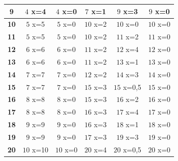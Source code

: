 \documentclass{article}
\begin{document}
\begin{center}
\begin{tabular}{|c||c|c|c|c|c|}
        \hline
        \textbf{9}& \cellcolor[HTML]{3FFC45}$4$ x={4} & \cellcolor[HTML]{FC3F3F}$4$ x={0}& \cellcolor[HTML]{3FFC45}$7$ x={1} & \cellcolor[HTML]{3FFC45}$9$ x={3} & \cellcolor[HTML]{FC3F3F}$9$ x={0}\\
        \hline
        \textbf{10}& \cellcolor[HTML]{3FFC45}$5$ x={5} & \cellcolor[HTML]{FC3F3F}$5$ x={0}& \cellcolor[HTML]{3FFC45}$10$ x={2} & \cellcolor[HTML]{FC3F3F}$10$ x={0}& \cellcolor[HTML]{FC3F3F}$10$ x={0}\\
        \hline
        \textbf{11}& \cellcolor[HTML]{3FFC45}$5$ x={5} & \cellcolor[HTML]{FC3F3F}$5$ x={0}& \cellcolor[HTML]{3FFC45}$10$ x={2} & \cellcolor[HTML]{3FFC45}$11$ x={2} & \cellcolor[HTML]{FC3F3F}$11$ x={0}\\
        \hline
        \textbf{12}& \cellcolor[HTML]{3FFC45}$6$ x={6} & \cellcolor[HTML]{FC3F3F}$6$ x={0}& \cellcolor[HTML]{3FFC45}$11$ x={2} & \cellcolor[HTML]{3FFC45}$12$ x={4} & \cellcolor[HTML]{FC3F3F}$12$ x={0}\\
        \hline
        \textbf{13}& \cellcolor[HTML]{3FFC45}$6$ x={6} & \cellcolor[HTML]{FC3F3F}$6$ x={0}& \cellcolor[HTML]{3FFC45}$11$ x={2} & \cellcolor[HTML]{3FFC45}$13$ x={1} & \cellcolor[HTML]{FC3F3F}$13$ x={0}\\
        \hline
        \textbf{14}& \cellcolor[HTML]{3FFC45}$7$ x={7} & \cellcolor[HTML]{FC3F3F}$7$ x={0}& \cellcolor[HTML]{3FFC45}$12$ x={2} & \cellcolor[HTML]{3FFC45}$14$ x={3} & \cellcolor[HTML]{FC3F3F}$14$ x={0}\\
        \hline
        \textbf{15}& \cellcolor[HTML]{3FFC45}$7$ x={7} & \cellcolor[HTML]{FC3F3F}$7$ x={0}& \cellcolor[HTML]{3FFC45}$15$ x={3} & \cellcolor[HTML]{3F62FC}$15$ x={0,5}& \cellcolor[HTML]{FC3F3F}$15$ x={0}\\
        \hline
        \textbf{16}& \cellcolor[HTML]{3FFC45}$8$ x={8} & \cellcolor[HTML]{FC3F3F}$8$ x={0}& \cellcolor[HTML]{3FFC45}$15$ x={3} & \cellcolor[HTML]{3FFC45}$16$ x={2} & \cellcolor[HTML]{FC3F3F}$16$ x={0}\\
        \hline
        \textbf{17}& \cellcolor[HTML]{3FFC45}$8$ x={8} & \cellcolor[HTML]{FC3F3F}$8$ x={0}& \cellcolor[HTML]{3FFC45}$16$ x={3} & \cellcolor[HTML]{3FFC45}$17$ x={4} & \cellcolor[HTML]{FC3F3F}$17$ x={0}\\
        \hline
        \textbf{18}& \cellcolor[HTML]{3FFC45}$9$ x={9} & \cellcolor[HTML]{FC3F3F}$9$ x={0}& \cellcolor[HTML]{3FFC45}$16$ x={3} & \cellcolor[HTML]{3FFC45}$18$ x={1} & \cellcolor[HTML]{FC3F3F}$18$ x={0}\\
        \hline
        \textbf{19}& \cellcolor[HTML]{3FFC45}$9$ x={9} & \cellcolor[HTML]{FC3F3F}$9$ x={0}& \cellcolor[HTML]{3FFC45}$17$ x={3} & \cellcolor[HTML]{3FFC45}$19$ x={3} & \cellcolor[HTML]{FC3F3F}$19$ x={0}\\
        \hline
        \textbf{20}& \cellcolor[HTML]{3FFC45}$10$ x={10} & \cellcolor[HTML]{FC3F3F}$10$ x={0}& \cellcolor[HTML]{3FFC45}$20$ x={4} & \cellcolor[HTML]{3F62FC}$20$ x={0,5}& \cellcolor[HTML]{FC3F3F}$20$ x={0}\\
        \hline
    \end{tabular}
\end{center}
\end{document}
